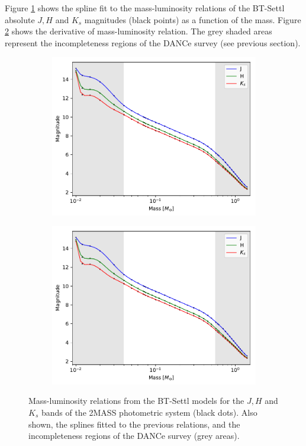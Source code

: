 Figure \ref{fig:splineML} shows the spline fit to the mass-luminosity relations of the BT-Settl absolute $J,H$ and $K_s$ magnitudes (black points) as a function of the mass. Figure \ref{fig:der_splineML} shows the derivative of mass-luminosity relation. The grey shaded areas represent the incompleteness regions of the DANCe survey (see previous section).

\begin{figure}[ht!]
    \centering
    \begin{subfigure}[t]{0.7\textwidth}
    \centering
       \includegraphics[page=1,width=\textwidth]{background/Figures/FitSpline_AllardModels.pdf}
        \caption{}
        \label{fig:splineML}
    \end{subfigure}
    \begin{subfigure}[t]{0.7\textwidth}
    \centering
     \includegraphics[page=2,width=\textwidth]{background/Figures/FitSpline_AllardModels.pdf}
        \caption{}
        \label{fig:der_splineML}
    \end{subfigure}
\caption{Mass-luminosity relations from the BT-Settl models for the $J, H$ and $K_s$ bands of the 2MASS photometric system (black dots). Also shown, the splines fitted to the previous relations, and the incompleteness regions of the DANCe survey (grey areas). }
\label{fig:ML}
\end{figure}

